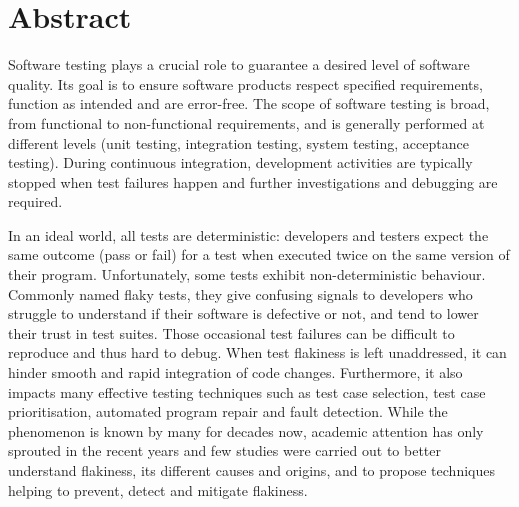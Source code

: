 \chapter*{Abstract}

Software testing plays a crucial role to guarantee a desired level of software quality. Its goal is to ensure software products respect specified requirements, function as intended and are error-free. The scope of software testing is broad, from functional to non-functional requirements, and is generally performed at different levels (\eg unit testing, integration testing, system testing, acceptance testing). During continuous integration, development activities are typically stopped when test failures happen and further investigations and debugging are required.

In an ideal world, all tests are deterministic: developers and testers expect the same outcome (pass or fail) for a test when executed twice on the same version of their program. Unfortunately, some tests exhibit non-deterministic behaviour. Commonly named flaky tests, they give confusing signals to developers who struggle to understand if their software is defective or not, and tend to lower their trust in test suites. Those occasional test failures can be difficult to reproduce and thus hard to debug. When test flakiness is left unaddressed, it can hinder smooth and rapid integration of code changes. Furthermore, it also impacts many effective testing techniques such as test case selection, test case prioritisation, automated program repair and fault detection. While the phenomenon is known by many for decades now, academic attention has only sprouted in the recent years and few studies were carried out to better understand flakiness, its different causes and origins, and to propose techniques helping to prevent, detect and mitigate flakiness. 

